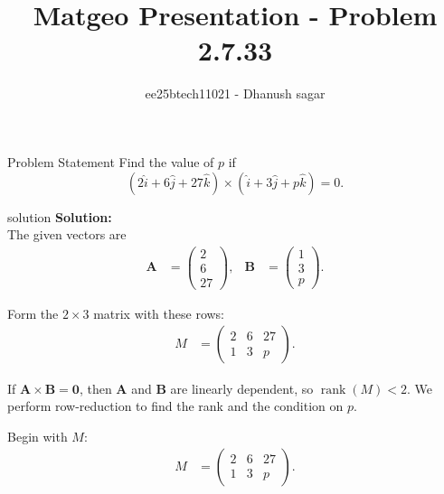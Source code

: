 \documentclass{beamer}
\title{Matgeo Presentation - Problem 2.7.33}
\author{ee25btech11021 - Dhanush sagar}
\numberwithin{equation}{section}
\theoremstyle{remark}
\newcommand{\myvec}[1]{\ensuremath{\begin{pmatrix}#1\end{pmatrix}}}
\let\vec\mathbf
\begin{document}
	

		




\begin{frame}
  \titlepage
\end{frame}

\begin{frame}{Problem Statement}
   Find the value of $p$ if
\[
(2\hat{i} + 6\hat{j} + 27\hat{k}) \times (\hat{i} + 3\hat{j} + p\hat{k}) = 0.
\]
\end{frame}

\begin{frame}{solution}
\textbf{Solution:} \\
The given vectors are
\begin{align}
\vec{A} &= \myvec{2 \\ 6 \\ 27}, 
& \vec{B} &= \myvec{1 \\ 3 \\ p}.
\end{align}

Form the $2\times 3$ matrix with these rows:
\begin{align}
M &= \myvec{2 & 6 & 27 \\[4pt] 1 & 3 & p }.
\end{align}

If \(\vec{A}\times\vec{B}=\mathbf{0}\), then \(\vec{A}\) and \(\vec{B}\) are linearly dependent, so \(\operatorname{rank}(M)<2\). We perform row-reduction to find the rank and the condition on \(p\).

Begin with \(M\):
\begin{align}
M &= \myvec{2 & 6 & 27 \\[4pt] 1 & 3 & p }.
\end{align}
\end{frame}
\end{document}
